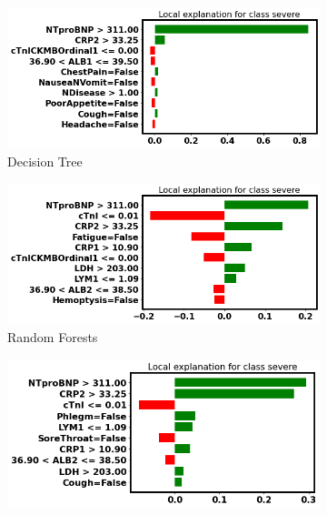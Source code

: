 \begin{figure}
\centering
\begin{subfigure}[b]{0.45\textwidth}
    \centering
    \includegraphics[width=\textwidth]{figures/chapter_interp/lime_dt_2.png}
    \caption{Decision Tree}
    \label{fig:lime_dt_2}
\end{subfigure}
\hfill
\begin{subfigure}[b]{0.45\textwidth}
    \centering
    \includegraphics[width=\textwidth]{figures/chapter_interp/lime_rf_2.png}
    \caption{Random Forests}
    \label{fig:lime_rf_2}
\end{subfigure}
\hfill
\begin{subfigure}[b]{0.45\textwidth}
    \centering
    \includegraphics[width=\textwidth]{figures/chapter_interp/lime_xgbc_2.png}

\end{subfigure}
\end{figure}
